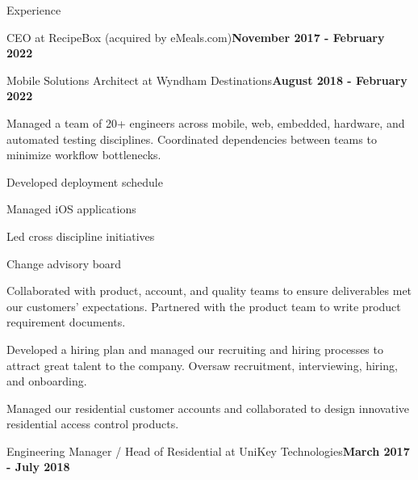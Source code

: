\documentclass{resume} %
\begin{document}
\begin{rSection}{Experience}
\begin{rSubsection}{CEO at RecipeBox (acquired by eMeals.com)}{\bf November 2017 - February 2022}{}{}
    \end{rSubsection}


    \begin{rSubsection}{Mobile Solutions Architect at Wyndham Destinations}{\bf August 2018 - February 2022}{}{}

    \item Managed a team of 20+ engineers across mobile, web, embedded, hardware, and automated testing disciplines. Coordinated dependencies between teams to minimize workflow bottlenecks.
    \item Developed deployment schedule 
    \item Managed iOS applications
    \item Led cross discipline initiatives 
    \item Change advisory board
    \item Collaborated with product, account, and quality teams to ensure deliverables met our customers' expectations. Partnered with the product team to write product requirement documents.
    \item Developed a hiring plan and managed our recruiting and hiring processes to attract great talent to the company. Oversaw recruitment, interviewing, hiring, and onboarding.
    \item Managed our residential customer accounts and collaborated to design innovative residential access control products.

    \end{rSubsection}


    \begin{rSubsection}{Engineering Manager / Head of Residential at UniKey Technologies}{\bf March 2017 - July 2018}{}{}


\end{rSubsection}
\end{rSection}
\end{document}
